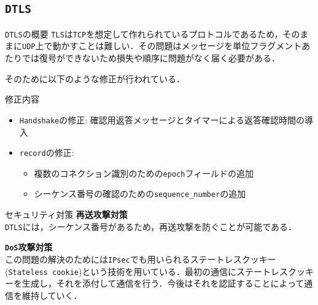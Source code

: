 \documentclass[11pt, aspectratio=169]{beamer}
\begin{document}
\subsection{\texttt{DTLS}}
\begin{frame}{\texttt{DTLS}の概要}
  \texttt{TLS}は\texttt{TCP}を想定して作れられているプロトコルであるため，そのままに\texttt{UDP}上で動かすことは難しい．その問題はメッセージを単位フラグメントあたりでは復号ができないため損失や順序に問題がなく届く必要がある．
  
  そのために以下のような修正が行われている．
  \begin{block}{修正内容}
    \begin{itemize}
      \item \texttt{Handshake}の修正: 確認用返答メッセージとタイマーによる返答確認時間の導入
      \item \texttt{record}の修正:
      \begin{itemize}
        \item 複数のコネクション識別のための\texttt{epoch}フィールドの追加
        \item シーケンス番号の確認のための\texttt{sequence\_number}の追加
      \end{itemize}
    \end{itemize}
  \end{block}
\end{frame}

\begin{frame}{セキュリティ対策}
  \textbf{再送攻撃対策} \\
    \texttt{DTLS}には，シーケンス番号があるため，再送攻撃を防ぐことが可能である．

  \vspace{1em}

  \textbf{\texttt{DoS}攻撃対策} \\
    この問題の解決のためには\texttt{IPsec}でも用いられるステートレスクッキー(\texttt{Stateless cookie})という技術を用いている．最初の通信にステートレスクッキーを生成し，それを添付して通信を行う．今後はそれを認証することによって通信を維持していく．
\end{frame}
     
\end{document}
